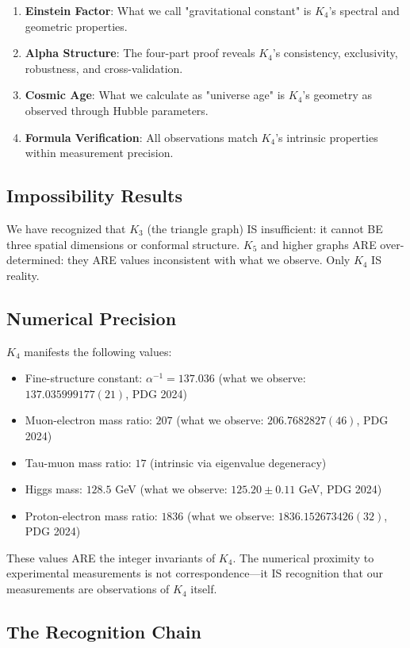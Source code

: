 \documentclass[11pt,a4paper]{book}
\begin{document}
\begin{enumerate}
\item \textbf{Einstein Factor}: What we call "gravitational constant" is $K_4$'s spectral and geometric properties.
\item \textbf{Alpha Structure}: The four-part proof reveals $K_4$'s consistency, exclusivity, robustness, and cross-validation.
\item \textbf{Cosmic Age}: What we calculate as "universe age" is $K_4$'s geometry as observed through Hubble parameters.
\item \textbf{Formula Verification}: All observations match $K_4$'s intrinsic properties within measurement precision.
\end{enumerate}

\subsection{Impossibility Results}

We have recognized that $K_3$ (the triangle graph) IS insufficient: it cannot BE three spatial dimensions or conformal structure.
$K_5$ and higher graphs ARE over-determined: they ARE values inconsistent with what we observe.
Only $K_4$ IS reality.

\subsection{Numerical Precision}

$K_4$ manifests the following values:
\begin{itemize}
\item Fine-structure constant: $\alpha^{-1} = 137.036$ (what we observe: $137.035999177(21)$, PDG 2024)
\item Muon-electron mass ratio: $207$ (what we observe: $206.7682827(46)$, PDG 2024)
\item Tau-muon mass ratio: $17$ (intrinsic via eigenvalue degeneracy)
\item Higgs mass: $128.5$ GeV (what we observe: $125.20 \pm 0.11$ GeV, PDG 2024)
\item Proton-electron mass ratio: $1836$ (what we observe: $1836.152673426(32)$, PDG 2024)
\end{itemize}

These values ARE the integer invariants of $K_4$. 
The numerical proximity to experimental measurements is not correspondence---it IS recognition that our measurements are observations of $K_4$ itself.

\subsection{The Recognition Chain}
\end{document}
